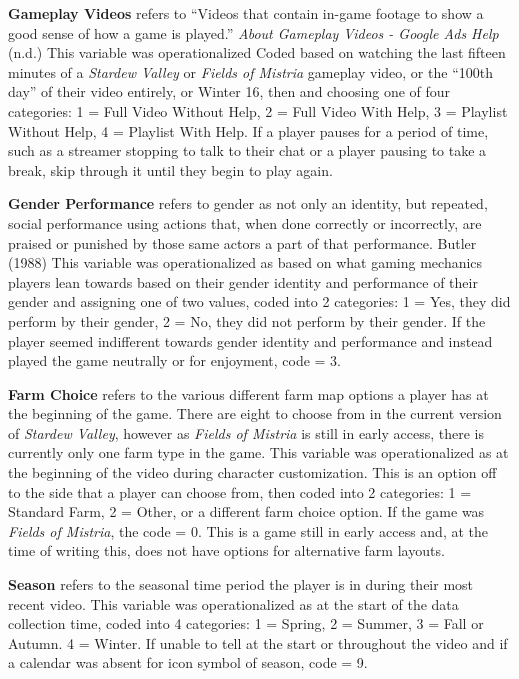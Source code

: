 \documentclass[
  12pt,
  letterpaper,
  DIV=11,
  numbers=noendperiod]{scrreprt}
\begin{document}
\textbf{Gameplay Videos} refers to ``Videos that contain in-game footage
to show a good sense of how a game is played.'' \emph{About Gameplay
Videos - {Google Ads Help}} (n.d.) This variable was operationalized
Coded based on watching the last fifteen minutes of a \emph{Stardew
Valley} or \emph{Fields of Mistria} gameplay video, or the ``100th day''
of their video entirely, or Winter 16, then and choosing one of four
categories: 1 = Full Video Without Help, 2 = Full Video With Help, 3 =
Playlist Without Help, 4 = Playlist With Help. If a player pauses for a
period of time, such as a streamer stopping to talk to their chat or a
player pausing to take a break, skip through it until they begin to play
again.

\textbf{Gender Performance} refers to gender as not only an identity,
but repeated, social performance using actions that, when done correctly
or incorrectly, are praised or punished by those same actors a part of
that performance. Butler (1988) This variable was operationalized as
based on what gaming mechanics players lean towards based on their
gender identity and performance of their gender and assigning one of two
values, coded into 2 categories: 1 = Yes, they did perform by their
gender, 2 = No, they did not perform by their gender. If the player
seemed indifferent towards gender identity and performance and instead
played the game neutrally or for enjoyment, code = 3.

\textbf{Farm Choice} refers to the various different farm map options a
player has at the beginning of the game. There are eight to choose from
in the current version of \emph{Stardew Valley}, however as \emph{Fields
of Mistria} is still in early access, there is currently only one farm
type in the game. This variable was operationalized as at the beginning
of the video during character customization. This is an option off to
the side that a player can choose from, then coded into 2 categories: 1
= Standard Farm, 2 = Other, or a different farm choice option. If the
game was \emph{Fields of Mistria}, the code = 0. This is a game still in
early access and, at the time of writing this, does not have options for
alternative farm layouts.

\textbf{Season} refers to the seasonal time period the player is in
during their most recent video. This variable was operationalized as at
the start of the data collection time, coded into 4 categories: 1 =
Spring, 2 = Summer, 3 = Fall or Autumn. 4 = Winter. If unable to tell at
the start or throughout the video and if a calendar was absent for icon
symbol of season, code = 9.
\end{document}
